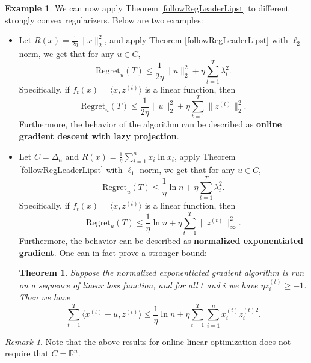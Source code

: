 \documentclass[openany]{book}
\newtheorem{theorem}{Theorem}[chapter]
\theoremstyle{definition}
\newtheorem{example}{Example}[chapter]
\theoremstyle{remark}
\newtheorem*{remark}{Remark}
\begin{document}
\begin{example}
    We can now apply Theorem \ref{followRegLeaderLipst} to different strongly convex regularizers. Below are two examples:
    \begin{itemize}
        \item Let $R(x)=\frac{1}{2\eta}\|x\|_2^2$, and apply Theorem \ref{followRegLeaderLipst} with $\ell_2$-norm, we get that for any $u\in C$,
        \begin{equation}
            \mathrm{Regret}_u(T)\le \frac{1}{2\eta}\|u\|_2^2+\eta \sum_{t=1}^{T}\lambda_t^2.
        \end{equation}
        Specifically, if $f_t(x)=\langle x,z^{(t)}\rangle$ is a linear function, then
        \begin{equation}
            \mathrm{Regret}_u(T)\le \frac{1}{2\eta}\|u\|_2^2+\eta \sum_{t=1}^{T}\|z^{(t)}\|_2^2.
        \end{equation}
        Furthermore, the behavior of the algorithm can be described as \textbf{online gradient descent with lazy projection}.

        \item Let $C=\Delta_n$ and $R(x)=\frac{1}{\eta}\sum_{i=1}^{n}x_i\ln x_i$, apply Theorem \ref{followRegLeaderLipst} with $\ell_1$-norm, we get that for any $u\in C$,
        \begin{equation}
            \mathrm{Regret}_u(T)\le \frac{1}{\eta}\ln n+\eta \sum_{t=1}^{T}\lambda_t^2.
        \end{equation}
        Specifically, if $f_t(x)=\langle x,z^{(t)}\rangle$ is a linear function, then
        \begin{equation}
            \mathrm{Regret}_u(T)\le \frac{1}{\eta}\ln n+\eta \sum_{t=1}^{T}\|z^{(t)}\|_{\infty}^2.
        \end{equation}
        Furthermore, the behavior can be described as \textbf{normalized exponentiated gradient}. One can in fact prove a stronger bound:
        \begin{theorem}\label{NEGLocalNorm}
            Suppose the normalized exponentiated gradient algorithm is run on a sequence of linear loss function, and for all $t$ and $i$ we have $\eta z_i^{(t)}\ge-1$. Then we have
            \begin{equation}
                \sum_{t=1}^{T}\langle x^{(t)}-u,z^{(t)}\rangle\le \frac{1}{\eta}\ln n+\eta \sum_{t=1}^{T}\sum_{i=1}^{n}x^{(t)}_iz^{(t)2}_i.
            \end{equation}
        \end{theorem}
    \end{itemize}
\end{example}
\begin{remark}
    Note that the above results for online linear optimization does not require that $C=\mathbb{R}^n$.
\end{remark}
\end{document}
